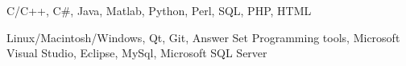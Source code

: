	\begin{description} \itemsep -3pt
		\item[Programming languages:] { C/C++,
			C\#, Java, Matlab, Python, Perl, SQL, PHP, HTML}
		\item[System and software:] { 
			Linux/Macintosh/Windows, Qt, Git, Answer Set
			Programming tools, Microsoft Visual Studio, Eclipse, MySql, Microsoft SQL Server
		}
	\end{description} %


%
%
%
%
%
%

